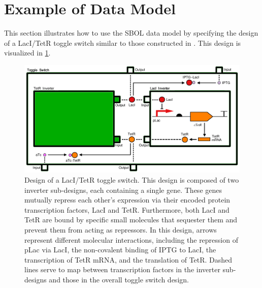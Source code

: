 \section{Example of Data Model}
\label{sec:examples}


This section illustrates how to use the SBOL data model by specifying the design of a LacI/TetR toggle switch similar to those constructed in \cite{Gardner2000}. This design is visualized in \ref{images:toggleswitch_modular}. 

\begin{figure}[ht]
\begin{center}
\includegraphics[scale=0.4]{images/toggleswitch_modular}
\caption[]{Design of a LacI/TetR toggle switch. This design is composed of two inverter sub-designs, each containing a single gene. These genes mutually repress each other's expression via their encoded protein transcription factors, LacI and TetR. Furthermore, both LacI and TetR are bound by specific small molecules that sequester them and prevent them from acting as repressors. In this design, arrows represent different molecular interactions, including the repression of pLac via LacI, the non-covalent binding of IPTG to LacI, the transcription of TetR mRNA, and the translation of TetR. Dashed lines serve to map between transcription factors in the inverter sub-designs and those in the overall toggle switch design.}
\label{images:toggleswitch_modular}
\end{center}
\end{figure}

